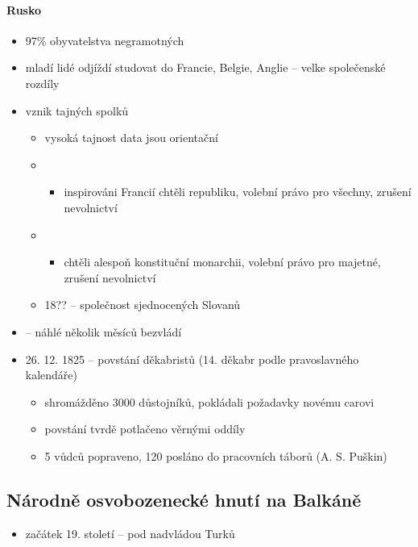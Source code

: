 \paragraph{Rusko}
\begin{itemize}
\item 97\% obyvatelstva negramotných
\item mladí lidé odjíždí studovat do Francie, Belgie, Anglie -- velke společenské rozdíly
\item[\ra] vznik tajných spolků
	\begin{itemize}
	\item vysoká tajnost \ra data jsou orientační
	\item {}
		\begin{itemize}
		\item inspirováni Francií chtěli republiku, volební právo pro všechny, zrušení nevolnictví
		\end{itemize}
	\item {}
		\begin{itemize}
		\item chtěli alespoň konstituční monarchii, volební právo pro majetné, zrušení nevolnictví
		\end{itemize}
	\item 18?? -- společnost sjednocených Slovanů
	\end{itemize}
\item {} -- náhlé \ra několik měsíců bezvládí
\item 26. 12. 1825 -- povstání děkabristů (14. děkabr podle pravoslavného kalendáře)
	\begin{itemize}
	\item shromážděno 3000 důstojníků, pokládali požadavky novému carovi
	\item povstání tvrdě potlačeno věrnými oddíly
	\item 5 vůdců popraveno, 120 posláno do pracovních táborů (A. S. Puškin)
	\end{itemize}
\end{itemize}

\subsection{Národně osvobozenecké hnutí na Balkáně}
\begin{itemize}
\item začátek 19. století -- pod nadvládou Turků
\end{itemize}

